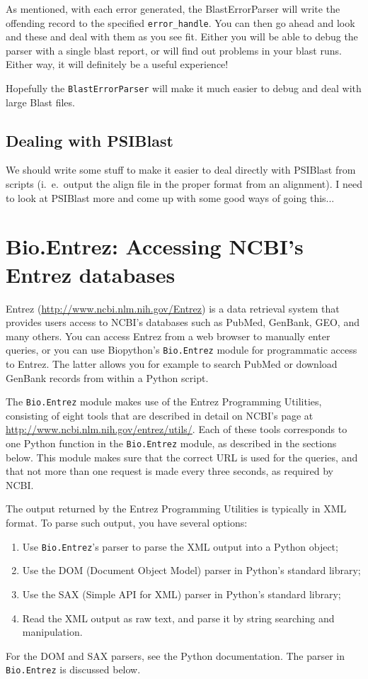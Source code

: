 \documentclass{report}
\begin{document}
As mentioned, with each error generated, the BlastErrorParser will write the offending record to the specified \verb|error_handle|. You can then go ahead and look and these and deal with them as you see fit. Either you will be able to debug the parser with a single blast report, or will find out problems in your blast runs. Either way, it will definitely be a useful experience!

Hopefully the \verb|BlastErrorParser| will make it much easier to debug and deal with large Blast files.

\section{Dealing with PSIBlast}

We should write some stuff to make it easier to deal directly with PSIBlast from scripts (i.~e.~output the align file in the proper format from an alignment). I need to look at PSIBlast more and come up with some good ways of going this...

\chapter{Bio.Entrez: Accessing NCBI's Entrez databases}
\label{chapter:entrez}

Entrez (\url{http://www.ncbi.nlm.nih.gov/Entrez}) is a data retrieval system that provides users access to NCBI's databases such as PubMed, GenBank, GEO, and many others. You can access Entrez from a web browser to manually enter queries, or you can use Biopython's \verb+Bio.Entrez+ module for programmatic access to Entrez. The latter allows you for example to search PubMed or download GenBank records from within a Python script.

The \verb+Bio.Entrez+ module makes use of the Entrez Programming Utilities, consisting of eight tools that are described in detail on NCBI's page at \url{http://www.ncbi.nlm.nih.gov/entrez/utils/}. Each of these tools corresponds to one Python function in the \verb+Bio.Entrez+ module, as described in the sections below. This module makes sure that the correct URL is used for the queries, and that not more than one request is made every three seconds, as required by NCBI.

The output returned by the Entrez Programming Utilities is typically in XML format. To parse such output, you have several options:
\begin{enumerate}
  \item Use \verb+Bio.Entrez+'s parser to parse the XML output into a Python object;
  \item Use the DOM (Document Object Model) parser in Python's standard library;
  \item Use the SAX (Simple API for XML) parser in Python's standard library;
  \item Read the XML output as raw text, and parse it by string searching and manipulation.
\end{enumerate}
For the DOM and SAX parsers, see the Python documentation. The parser in \verb+Bio.Entrez+ is discussed below.
\end{document}

